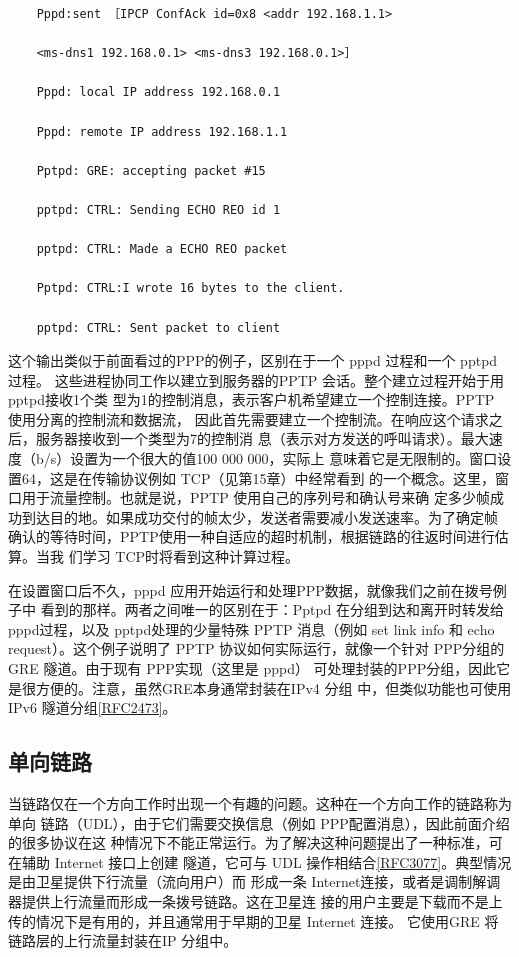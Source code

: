 \begin{verbatim}
    Pppd:sent ［IPCP ConfAck id=0x8 <addr 192.168.1.1>
    
    <ms-dns1 192.168.0.1> <ms-dns3 192.168.0.1>］
    
    Pppd: local IP address 192.168.0.1
    
    Pppd: remote IP address 192.168.1.1
    
    Pptpd: GRE: accepting packet #15
    
    pptpd: CTRL: Sending ECHO REO id 1
    
    pptpd: CTRL: Made a ECHO REO packet
    
    Pptpd: CTRL:I wrote 16 bytes to the client.
    
    pptpd: CTRL: Sent packet to client
\end{verbatim}

这个输出类似于前面看过的PPP的例子，区别在于一个 pppd 过程和一个 pptpd 过程。
这些进程协同工作以建立到服务器的PPTP 会话。整个建立过程开始于用pptpd接收1个类
型为1的控制消息，表示客户机希望建立一个控制连接。PPTP 使用分离的控制流和数据流，
因此首先需要建立一个控制流。在响应这个请求之后，服务器接收到一个类型为7的控制消
息（表示对方发送的呼叫请求）。最大速度（b/s）设置为一个很大的值100 000 000，实际上
意味着它是无限制的。窗口设置64，这是在传输协议例如 TCP（见第15章）中经常看到
的一个概念。这里，窗口用于流量控制。也就是说，PPTP 使用自己的序列号和确认号来确
定多少帧成功到达目的地。如果成功交付的帧太少，发送者需要减小发送速率。为了确定帧
确认的等待时间，PPTP使用一种自适应的超时机制，根据链路的往返时间进行估算。当我
们学习 TCP时将看到这种计算过程。

在设置窗口后不久，pppd 应用开始运行和处理PPP数据，就像我们之前在拨号例子中
看到的那样。两者之间唯一的区别在于：Pptpd 在分组到达和离开时转发给 pppd过程，以及
pptpd处理的少量特殊 PPTP 消息（例如 set link info 和 echo request）。这个例子说明了 PPTP
协议如何实际运行，就像一个针对 PPP分组的GRE 隧道。由于现有 PPP实现（这里是 pppd）
可处理封装的PPP分组，因此它是很方便的。注意，虽然GRE本身通常封装在IPv4 分组
中，但类似功能也可使用IPv6 隧道分组\href{https://www.rfc-editor.org/rfc/rfc2473}{[RFC2473]}。

\subsection{单向链路}

当链路仅在一个方向工作时出现一个有趣的问题。这种在一个方向工作的链路称为单向
链路（UDL），由于它们需要交换信息（例如 PPP配置消息），因此前面介绍的很多协议在这
种情况下不能正常运行。为了解决这种问题提出了一种标准，可在辅助 Internet 接口上创建
隧道，它可与 UDL 操作相结合\href{https://www.rfc-editor.org/rfc/rfc3077}{[RFC3077]}。典型情况是由卫星提供下行流量（流向用户）而
形成一条 Internet连接，或者是调制解调器提供上行流量而形成一条拨号链路。这在卫星连
接的用户主要是下载而不是上传的情况下是有用的，并且通常用于早期的卫星 Internet 连接。
它使用GRE 将链路层的上行流量封装在IP 分组中。

